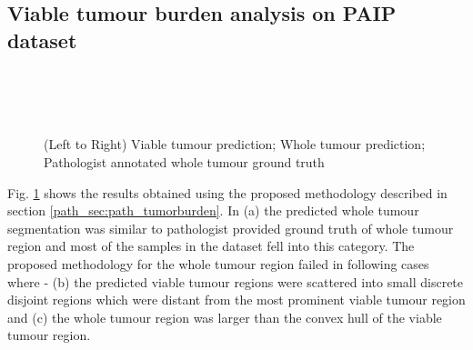 \documentclass[times,twocolumn,final,authoryear]{tmp}
\begin{document}
\subsection{Viable tumour burden analysis on PAIP dataset}
\begin{figure}
    \centering  
    \\
    \\
    \\
    \caption{(Left to Right) Viable tumour prediction; Whole tumour prediction; Pathologist annotated whole tumour ground truth}
    \label{path_fig:vtb-sample}
\end{figure}

Fig. \ref{path_fig:vtb-sample} shows the results obtained using the proposed methodology described in section \ref{path_sec:path_tumorburden}. In (a) the predicted whole tumour segmentation was similar to pathologist provided ground truth of whole tumour region and most of the samples in the dataset fell into this category. The proposed methodology for the whole tumour region failed in following cases where -  (b) the predicted viable tumour regions were scattered into small discrete disjoint regions which were distant from the most prominent viable tumour region and (c) the whole tumour region was larger than the convex hull of the viable tumour region.
\end{document}
